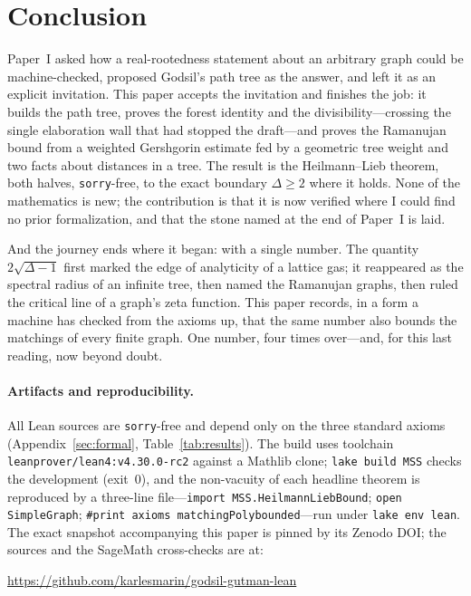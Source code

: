 \documentclass[11pt]{article}
\newcommand{\lean}[1]{{\def\_{\textunderscore\allowbreak}\texttt{#1}}}
\begin{document}
\section{Conclusion}

Paper~I asked how a real-rootedness statement about an arbitrary graph could be
machine-checked, proposed Godsil's path tree as the answer, and left it as an
explicit invitation. This paper accepts the invitation and finishes the job: it
builds the path tree, proves the forest identity and the divisibility---crossing
the single elaboration wall that had stopped the draft---and proves the Ramanujan
bound from a weighted Gershgorin estimate fed by a geometric tree weight and two
facts about distances in a tree. The result is the Heilmann--Lieb theorem, both
halves, \lean{sorry}-free, to the exact boundary $\Delta\ge2$ where it holds. None
of the mathematics is new; the contribution is that it is now verified where I
could find no prior formalization, and that the stone named at the end of Paper~I
is laid.

And the journey ends where it began: with a single number. The quantity
$2\sqrt{\Delta-1}$ first marked the edge of analyticity of a lattice gas; it
reappeared as the spectral radius of an infinite tree, then named the Ramanujan
graphs, then ruled the critical line of a graph's zeta function. This paper records,
in a form a machine has checked from the axioms up, that the same number also bounds
the matchings of every finite graph. One number, four times over---and, for this
last reading, now beyond doubt.

\paragraph{Artifacts and reproducibility.} All Lean sources are \lean{sorry}-free
and depend only on the three standard axioms (Appendix~\ref{sec:formal},
Table~\ref{tab:results}). The build uses toolchain
\lean{leanprover/lean4:v4.30.0-rc2} against a Mathlib clone; \lean{lake build MSS}
checks the development (exit~0), and the non-vacuity of each headline theorem is
reproduced by a three-line file---\lean{import MSS.HeilmannLiebBound};
\lean{open SimpleGraph}; \lean{\#print axioms matchingPoly\_bounded}---run under
\lean{lake env lean}. The exact snapshot accompanying this paper is pinned by its
Zenodo DOI; the sources and the SageMath cross-checks are at:
\begin{center}
\url{https://github.com/karlesmarin/godsil-gutman-lean}
\end{center}
\end{document}
